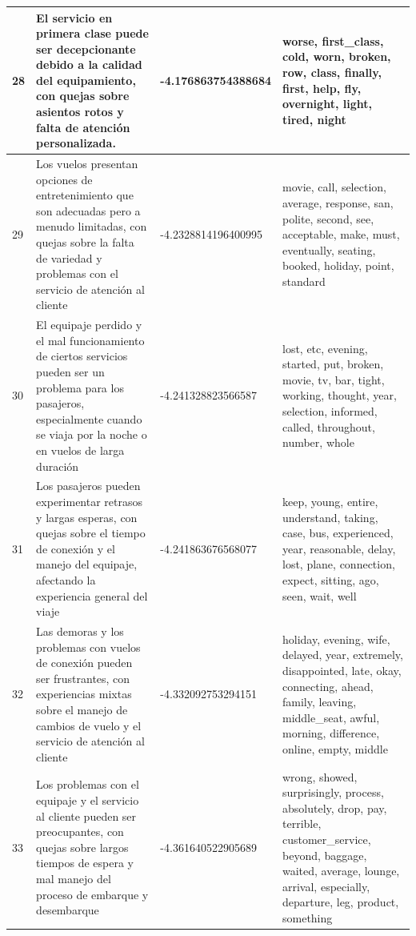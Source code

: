 \documentclass{report}
\begin{document}
{\begin{longtable}{|p{1cm}|p{4cm}|p{4cm}|p{6cm}|}
                    \hline
                    28 & El servicio en primera clase puede ser decepcionante debido a la calidad del equipamiento, con quejas sobre asientos rotos y falta de atención personalizada. & -4.176863754388684 & worse, first\_class, cold, worn, broken, row, class, finally, first, help, fly, overnight, light, tired, night \\
                    \hline
                    29 & Los vuelos presentan opciones de entretenimiento que son adecuadas pero a menudo limitadas, con quejas sobre la falta de variedad y problemas con el servicio de atención al cliente & -4.2328814196400995 & movie, call, selection, average, response, san, polite, second, see, acceptable, make, must, eventually, seating, booked, holiday, point, standard \\
                    \hline
                    30 & El equipaje perdido y el mal funcionamiento de ciertos servicios pueden ser un problema para los pasajeros, especialmente cuando se viaja por la noche o en vuelos de larga duración & -4.241328823566587 & lost, etc, evening, started, put, broken, movie, tv, bar, tight, working, thought, year, selection, informed, called, throughout, number, whole \\
                    \hline
                    31 & Los pasajeros pueden experimentar retrasos y largas esperas, con quejas sobre el tiempo de conexión y el manejo del equipaje, afectando la experiencia general del viaje & -4.241863676568077 & keep, young, entire, understand, taking, case, bus, experienced, year, reasonable, delay, lost, plane, connection, expect, sitting, ago, seen, wait, well \\
                    \hline
                    32 & Las demoras y los problemas con vuelos de conexión pueden ser frustrantes, con experiencias mixtas sobre el manejo de cambios de vuelo y el servicio de atención al cliente & -4.332092753294151 & holiday, evening, wife, delayed, year, extremely, disappointed, late, okay, connecting, ahead, family, leaving, middle\_seat, awful, morning, difference, online, empty, middle \\
                    \hline
                    33 & Los problemas con el equipaje y el servicio al cliente pueden ser preocupantes, con quejas sobre largos tiempos de espera y mal manejo del proceso de embarque y desembarque & -4.361640522905689 & wrong, showed, surprisingly, process, absolutely, drop, pay, terrible, customer\_service, beyond, baggage, waited, average, lounge, arrival, especially, departure, leg, product, something \\

\end{longtable}}
\end{document}
